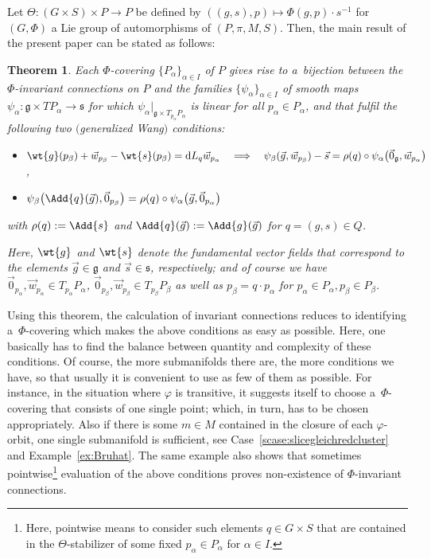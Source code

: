 \documentclass[pdftex]{sigma}
\numberwithin{equation}{section}
\newtheorem*{satz}{Theorem}
\begin{document}
Let $\Theta\colon (G\times S)\times P\rightarrow P$ be def\/ined by $((g,s),p)\mapsto \Phi(g,p)\cdot s^{-1}$ for $(G,\Phi)$ a Lie group of automorphisms of $(P,\pi,M,S)$. Then, the main
result of the present paper can be stated as follows:

\begin{satz}
Each $\Phi$-covering $\{P_\alpha\}_{\alpha\in I}$ of $P$ gives rise to a~bijection between the $\Phi$-invariant connections on $P$ and the families $\{\psi_\alpha\}_{\alpha\in I}$ of smooth maps $\psi_\alpha\colon \mathfrak{g}\times TP_\alpha
\rightarrow \mathfrak{s}$ for which ${\psi_\alpha}|_{\mathfrak{g}\times T_{p_\alpha} P_\alpha}$ is linear for all
$p_\alpha\in P_\alpha$, and that fulfil the following two $($generalized Wang$)$ conditions:
\begin{itemize}\itemsep=0pt
\item
$\wt{g}(p_\beta) + \vec{w}_{p_\beta}-\wt{s}(p_\beta)={\rm d}L_q\vec{w}_{p_\alpha}
\quad
\Longrightarrow
\quad
\psi_\beta(\vec{g},\vec{w}_{p_\beta})-\vec{s}=\rho(q)\circ\psi_\alpha\big(\vec{0}_{\mathfrak{g}},\vec{w}_{p_\alpha}\big)$,
\item
$\psi_\beta\big(\Add{q}(\vec{g}),\vec{0}_{p_\beta}\big)=\rho(q)\circ
\psi_\alpha\big(\vec{g},\vec{0}_{p_\alpha}\big)$
\end{itemize}
with $\rho(q):=\Add{s}$ and $\Add{q}(\vec{g}):=\Add{g}(\vec{g})$ for $q=(g,s)\in Q$.

 Here, $\wt{g}$ and $\wt{s}$ denote the fundamental vector fields that correspond to the elements $\vec{g}\in \mathfrak{g}$ and
$\vec{s}\in \mathfrak{s}$, respectively; and of course we have $\vec{0}_{p_\alpha},\vec{w}_{p_\alpha}\in T_{p_\alpha}P_\alpha$, $\vec{0}_{p_\beta},\vec{w}_{p_\beta}\in T_{p_\beta}P_\beta$ as well as $p_\beta=q\cdot p_\alpha$ for $p_\alpha\in P_\alpha, p_\beta\in P_\beta$.
\end{satz}

Using this theorem, the calculation of invariant connections reduces to identifying a~$\Phi$-covering which makes the
above conditions as easy as possible.
Here, one basically has to f\/ind the balance between quantity and complexity of these conditions.
Of course, the more submanifolds there are, the more conditions we have, so that usually it is convenient to use as few
of them as possible.
For instance, in the situation where $\varphi$ is transitive, it suggests itself to choose a~$\Phi$-covering that
consists of one single point; which, in turn, has to be chosen appropriately.
Also if there is some $m\in M$ contained in the closure of each $\varphi$-orbit, one single submanifold is suf\/f\/icient,
see Case~\ref{scase:slicegleichredcluster} and Example~\ref{ex:Bruhat}.
The same example also shows that sometimes pointwise\footnote{Here, pointwise means to consider such elements $q\in G\times S$
that are contained in the $\Theta$-stabilizer of some f\/ixed $p_\alpha\in P_\alpha$ for $\alpha\in I$.} evaluation of the
above conditions proves non-existence of $\Phi$-invariant connections.
\end{document}
